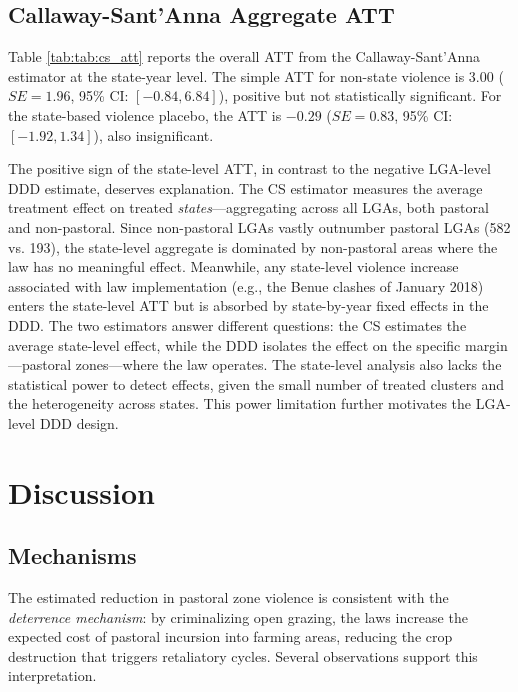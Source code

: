 \documentclass[12pt]{article}
\begin{document}
\subsection{Callaway-Sant'Anna Aggregate ATT}

Table \ref{tab:tab:cs_att} reports the overall ATT from the Callaway-Sant'Anna estimator at the state-year level. The simple ATT for non-state violence is 3.00 ($SE = 1.96$, 95\% CI: $[-0.84, 6.84]$), positive but not statistically significant. For the state-based violence placebo, the ATT is $-0.29$ ($SE = 0.83$, 95\% CI: $[-1.92, 1.34]$), also insignificant.

The positive sign of the state-level ATT, in contrast to the negative LGA-level DDD estimate, deserves explanation. The CS estimator measures the average treatment effect on treated \textit{states}---aggregating across all LGAs, both pastoral and non-pastoral. Since non-pastoral LGAs vastly outnumber pastoral LGAs (582 vs. 193), the state-level aggregate is dominated by non-pastoral areas where the law has no meaningful effect. Meanwhile, any state-level violence increase associated with law implementation (e.g., the Benue clashes of January 2018) enters the state-level ATT but is absorbed by state-by-year fixed effects in the DDD. The two estimators answer different questions: the CS estimates the average state-level effect, while the DDD isolates the effect on the specific margin---pastoral zones---where the law operates. The state-level analysis also lacks the statistical power to detect effects, given the small number of treated clusters and the heterogeneity across states. This power limitation further motivates the LGA-level DDD design.




\section{Discussion}

\subsection{Mechanisms}

The estimated reduction in pastoral zone violence is consistent with the \textit{deterrence mechanism}: by criminalizing open grazing, the laws increase the expected cost of pastoral incursion into farming areas, reducing the crop destruction that triggers retaliatory cycles. Several observations support this interpretation.
\end{document}
